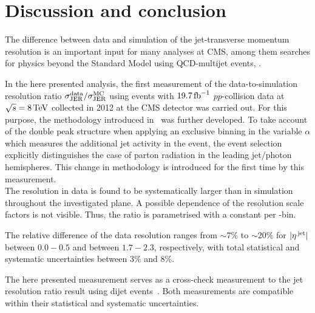 \FloatBarrier
\chapter{Discussion and conclusion}
The difference between data and simulation of the jet-transverse momentum resolution is an important input for many analyses at CMS, among them searches for physics beyond the Standard Model using QCD-multijet events, \eg\cite{bib:CMS:RA2_8TeV}.

In the here presented analysis, the first measurement of the data-to-simulation resolution ratio $\sigma_\mathrm{JER}^{\text{data}}/\sigma_\mathrm{JER}^{\text{MC}}$ using \GAMJET events with $19.7\,\text{fb}^{-1}$ $pp$-collision data at $\sqrt{s}=8 \,\text{Te}\kern-0.06667em\text{V}$ collected in 2012 at the CMS detector was carried out.
For this purpose, the methodology introduced in~\cite{bib:CMS:JERCPaper_2011,CMS:PAS:JETResolution_7TeV} was further developed.
To take account of the double peak structure when applying an exclusive binning in the variable $\alpha$ which measures the additional jet activity in the event, the event selection explicitly distinguishes the case of parton radiation in the leading jet/photon hemispheres.
This change in methodology is introduced for the first time by this measurement.\\


The resolution in data is found to be systematically larger than in simulation throughout the investigated \etajet plane. 
A possible \ptgamma dependence of the resolution scale factors \rhores is not visible. 
Thus, the ratio is parametrised with a constant per \etajet-bin.

The relative difference of the data resolution ranges from $\sim 7\%$ to $\sim20\%$ for $|{\eta}^{\text{\,jet}}|$ between $0.0-0.5$ and between $1.7-2.3$, respectively, with total statistical and systematic uncertainties between 3\% and 8\%.

The here presented measurement serves as a cross-check measurement to the jet \pt resolution ratio result using dijet events~\cite{bib:CMS:JME_PAS,bib:Kristin_Thesis}.
Both measurements are compatible within their statistical and systematic uncertainties.\\

